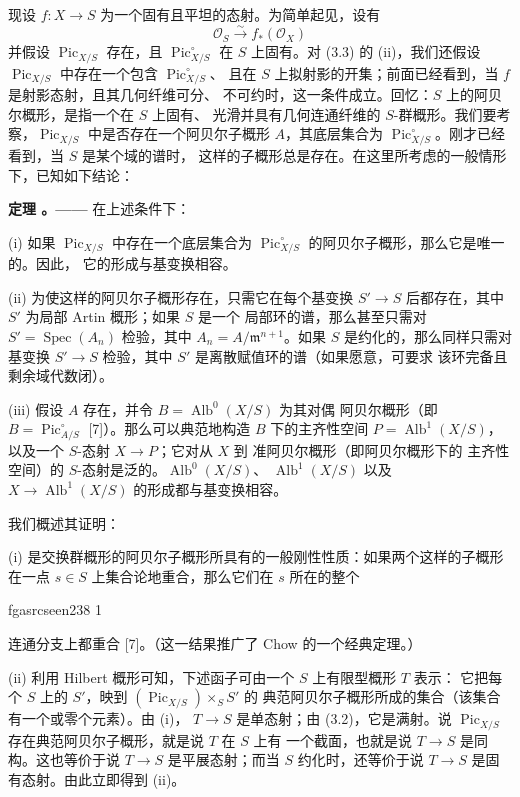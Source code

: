 \documentclass[12pt,twoside,openany]{book}
\numberwithin{equation}{section}
\newcommand{\fgaunitid}{unbound}
\newcommand{\src}[1]{%
  \phantomsection
  \hypertarget{src:\fgaunitid:#1}{}%
  \hypertarget{fga.\fgaunitid.p#1}{}%
  \ifcsname fgasrcseen#1\endcsname\else
    \expandafter\gdef\csname fgasrcseen#1\endcsname{1}%
    \hypertarget{src:#1}{}%
  \fi
  \marginpar{\raggedleft\footnotesize\sffamily #1}%
}
\theoremstyle{plain}
\theoremstyle{definition}
\theoremstyle{remark}
\newcommand{\result}[2]{%
  \par\medskip\noindent\textbf{#1%
  \if\relax\detokenize{#2}\relax\else\space#2\fi。——}\enspace
}
\begin{document}
现设 $f:X\longrightarrow S$ 为一个固有且平坦的态射。为简单起见，设有
\[
\mathcal O_S\xrightarrow{\sim}f_*(\mathcal O_X)
\]
并假设 $\operatorname{Pic}_{X/S}$ 存在，且
$\operatorname{Pic}_{X/S}^\circ$ 在 $S$ 上固有。对 (3.3) 的 (ii)，我们还假设
$\operatorname{Pic}_{X/S}$ 中存在一个包含 $\operatorname{Pic}_{X/S}^\circ$、
且在 $S$ 上拟射影的开集；前面已经看到，当 $f$ 是射影态射，且其几何纤维可分、
不可约时，这一条件成立。回忆：$S$ 上的阿贝尔概形，是指一个在 $S$ 上固有、
光滑并具有几何连通纤维的 $S$-群概形。我们要考察，$\operatorname{Pic}_{X/S}$
中是否存在一个阿贝尔子概形 $A$，其底层集合为
$\operatorname{Pic}_{X/S}^\circ$。刚才已经看到，当 $S$ 是某个域的谱时，
这样的子概形总是存在。在这里所考虑的一般情形下，已知如下结论：

\result{定理}{3.3} 在上述条件下：

\noindent(i) 如果 $\operatorname{Pic}_{X/S}$ 中存在一个底层集合为
$\operatorname{Pic}_{X/S}^\circ$ 的阿贝尔子概形，那么它是唯一的。因此，
它的形成与基变换相容。

\noindent(ii) 为使这样的阿贝尔子概形存在，只需它在每个基变换
$S'\longrightarrow S$ 后都存在，其中 $S'$ 为局部 Artin 概形；如果 $S$ 是一个
局部环的谱，那么甚至只需对 $S'=\operatorname{Spec}(A_n)$ 检验，其中
$A_n=A/\mathfrak m^{n+1}$。如果 $S$ 是约化的，那么同样只需对基变换
$S'\longrightarrow S$ 检验，其中 $S'$ 是离散赋值环的谱（如果愿意，可要求
该环完备且剩余域代数闭）。

\noindent(iii) 假设 $A$ 存在，并令 $B=\operatorname{Alb}^0(X/S)$ 为其对偶
阿贝尔概形（即 $B=\operatorname{Pic}_{A/S}^\circ$ [7]）。那么可以典范地构造
$B$ 下的主齐性空间 $P=\operatorname{Alb}^1(X/S)$，以及一个 $S$-态射
$X\longrightarrow P$；它对从 $X$ 到 准阿贝尔概形（即阿贝尔概形下的
主齐性空间）的 $S$-态射是泛的。$\operatorname{Alb}^0(X/S)$、
$\operatorname{Alb}^1(X/S)$ 以及 $X\longrightarrow\operatorname{Alb}^1(X/S)$
的形成都与基变换相容。

我们概述其证明：

(i) 是交换群概形的阿贝尔子概形所具有的一般刚性性质：如果两个这样的子概形
在一点 $s\in S$ 上集合论地重合，那么它们在 $s$ 所在的整个

\src{238}
连通分支上都重合 [7]。（这一结果推广了 Chow 的一个经典定理。）

(ii) 利用 Hilbert 概形可知，下述函子可由一个 $S$ 上有限型概形 $T$ 表示：
它把每个 $S$ 上的 $S'$，映到 $(\operatorname{Pic}_{X/S})\times_S S'$ 的
典范阿贝尔子概形所成的集合（该集合有一个或零个元素）。由 (i)，
$T\longrightarrow S$ 是单态射；由 (3.2)，它是满射。说
$\operatorname{Pic}_{X/S}$ 存在典范阿贝尔子概形，就是说 $T$ 在 $S$ 上有
一个截面，也就是说 $T\longrightarrow S$ 是同构。这也等价于说
$T\longrightarrow S$ 是平展态射；而当 $S$ 约化时，还等价于说
$T\longrightarrow S$ 是固有态射。由此立即得到 (ii)。
\end{document}
